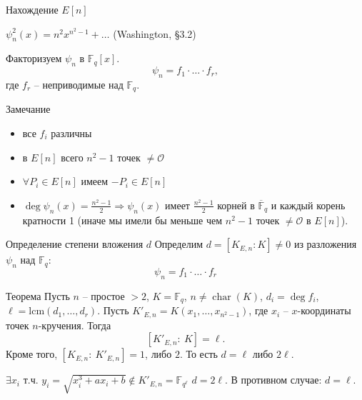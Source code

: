\documentclass{beamer}
\begin{document}
\begin{frame}{Нахождение $E[n]$}
	\begin{center}
		$\psi_n^2(x) = {n^2}{x^{{n^2} - 1}} +  \ldots$ \hfill {\small(Washington, \S3.2)}
	\end{center}
	
	Факторизуем $\psi_n$ в $\mathbb{F}_q[x]$.
	\[\psi_n = f_1 \cdot \ldots \cdot f_r,\]
	где $f_r$ -- неприводимые над $\mathbb{F}_q$.
	\begin{block}{Замечание}
		\begin{itemize}
			\item все $f_i$ различны
			\item в $E[n]$ всего ${n^2} - 1$ точек $\neq \mathcal{O}$
			\item $\forall P_i \in E[n]$ имеем $-P_i \in E[n]$
			\item $\deg {\psi _n}( x ) = \frac{{{n^2} - 1}}{2} \Rightarrow {\psi _n}( x )$ имеет $\frac{{{n^2} - 1}}{2}$ корней в $\overline{\mathbb{F}}_q$ и каждый корень кратности 1 (иначе мы имели бы меньше чем ${n^2} - 1$ точек $ \ne \mathcal{O}$ в $E[n]$). 
		\end{itemize}
	\end{block}
\end{frame}

\begin{frame}{Определение степени вложения $d$}
	Определим $d = [K_{E,n} : K] \ne 0$ из разложения $\psi_n$ над $\mathbb{F}_q$: 
	\[\psi_n = f_1 \cdot \ldots \cdot f_r\]
	\begin{block}{Теорема}
		Пусть $n$ -- простое $> 2$, $K = \mathbb{F}_q$, $n \ne \operatorname{char}(K)$,
		$d_i = \deg {f_i}$,
		$\ell = \mathrm{lcm}(d_1, \ldots, d_r)$.
		Пусть $K'_{E,n} = K( {{x_1}, \ldots, {x_{{n^2} - 1}}})$, где ${x_i}$ -- $x$-координаты точек $n$-кручения. Тогда 
		\[[ {K'_{E,n}:\:K} ] = \ell.
		\]
		Кроме того, $[ {{K_{E,n}}:\:K'_{E,n}} ] = 1$, либо $2$. То есть $d = \ell$ либо $2\ell$. 
	\end{block}
	
	\structure{$\triangleleft$}
	$\exists x_i$ т.ч. $y_i = \sqrt{x_i^3 + a x_i + b} \not\in K'_{E,n} = \mathbb{F}_{q^\ell}$ \structure{$\implies$} $d = 2 \ell$.
	В противном случае: $d = \ell$.
	\structure{$\triangleright$}
\end{frame}
\end{document}
